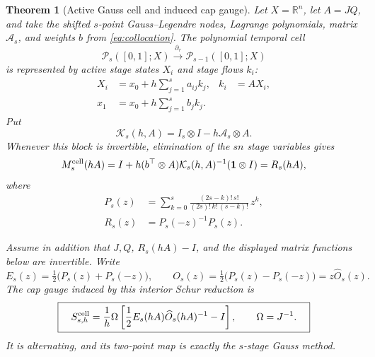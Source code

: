 \documentclass[11pt,a4paper]{article}
\newtheorem{theorem}{Theorem}[section]
\newcommand{\R}{\mathbb R}
\newcommand{\one}{\bm 1}
\begin{document}
\begin{theorem}[Active Gauss cell and induced cap gauge]
\label{thm:active-gauss-cell}
Let \(X=\R^n\), let \(A=JQ\), and take the shifted \(s\)-point
Gauss--Legendre nodes, Lagrange polynomials, matrix \(\mathcal A_s\), and
weights \(b\) from \cref{eq:collocation}.  The polynomial temporal cell
\[
 \mathcal P_s([0,1];X)
 \xrightarrow{\ \partial_\tau\ }
 \mathcal P_{s-1}([0,1];X)
\]
is represented by active stage states \(X_i\) and stage flows \(k_i\):
\begin{align}
 X_i&=x_0+h\sum_{j=1}^s a_{ij}k_j,
 &k_i&=AX_i,\label{eq:active-gauss-stages}\\
 x_1&=x_0+h\sum_{j=1}^s b_jk_j.
 \label{eq:active-gauss-output}
\end{align}
Put
\begin{equation}\label{eq:active-stage-block}
 \mathcal K_s(h,A)=I_s\otimes I-h\mathcal A_s\otimes A.
\end{equation}
Whenever this block is invertible, elimination of the \(sn\) stage
variables gives
\begin{equation}\label{eq:active-stage-schur-map}
 M_s^{\rm cell}(hA)
 =I+h(b^\top\otimes A)\mathcal K_s(h,A)^{-1}(\one\otimes I)
 =R_s(hA),
\end{equation}
where
\begin{align}
 P_s(z)&=\sum_{k=0}^s
 \frac{(2s-k)!\,s!}{(2s)!\,k!\,(s-k)!}\,z^k,
 \label{eq:pade-polynomial}\\
 R_s(z)&=P_s(-z)^{-1}P_s(z).
 \label{eq:diagonal-pade-map}
\end{align}

Assume in addition that \(J,Q\), \(R_s(hA)-I\), and the displayed
matrix functions below are invertible.  Write
\[
 E_s(z)=\tfrac12\bigl(P_s(z)+P_s(-z)\bigr),\qquad
 O_s(z)=\tfrac12\bigl(P_s(z)-P_s(-z)\bigr)
       =z\widehat O_s(z).
\]
The cap gauge induced by this interior Schur reduction is
\begin{equation}\label{eq:stage-induced-gauss-gauge}
 \boxed{\quad
 S_{s,h}^{\rm cell}
 =\frac1h\Omega
 \left[
  \frac12E_s(hA)\widehat O_s(hA)^{-1}-I
 \right],
 \qquad \Omega=J^{-1}.
 \quad}
\end{equation}
It is alternating, and its two-point map is exactly the \(s\)-stage
Gauss method.
\end{theorem}
\end{document}
